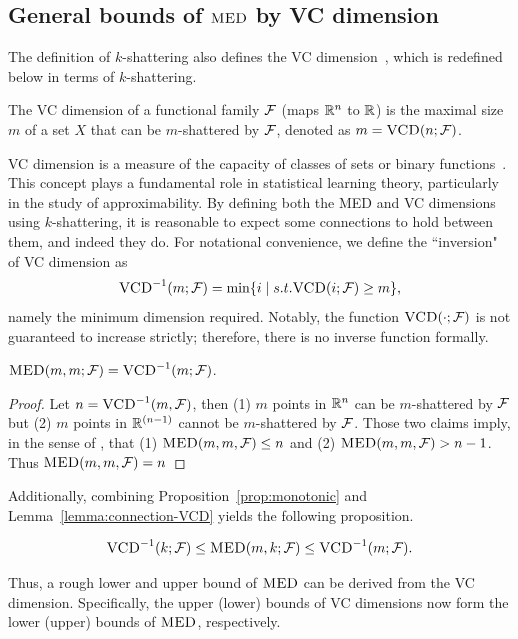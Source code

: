 \documentclass[10pt]{article}
\begin{document}
\subsection{General bounds of $\textsc{MED}$ by VC dimension}

The definition of $k$-shattering also defines the VC dimension~\cite{mohri2018foundations}, which is redefined below in terms of $k$-shattering.
\begin{definition}[VC dimension]
    The VC dimension of a functional family $\mathcal{F}$ (maps $\mathbb{R}^n$ to $\mathbb{R}$) is the maximal size $m$ of a set $X$ that can be $m$-shattered by $\mathcal{F}$, denoted as $m = \textsc{VCD}(n; \mathcal{F})$.
\end{definition}
VC dimension is a measure of the capacity of classes of sets or binary functions~\cite{vapnik2013nature}. This concept plays a fundamental role in statistical learning theory, particularly in the study of approximability. By defining both the MED and VC dimensions using $k$-shattering, it is reasonable to expect some connections to hold between them, and indeed they do. For notational convenience, we define the ``inversion" of VC dimension as $$\textsc{VCD}^{-1}(m; \mathcal{F})=\min \{i \mid s.t. \textsc{VCD}(i;\mathcal{F})\ge m\},$$ namely the minimum dimension required. Notably, the function $\textsc{VCD}(\cdot ;\mathcal{F})$ is not guaranteed to increase strictly; therefore, there is no inverse function formally.
\begin{lemma}\label{lemma:connection-VCD}
    $\textsc{MED}(m, m;\mathcal{F}) = \textsc{VCD}^{-1}(m;\mathcal{F})$.
\end{lemma}

\begin{proof}
    Let $n = \textsc{VCD}^{-1}(m, \mathcal{F})$, then (1) $m$ points in $\mathbb{R}^n$ can be $m$-shattered by $\mathcal{F}$ but (2) $m$ points in $\mathbb{R}^{(n-1)}$ cannot be $m$-shattered by $\mathcal{F}$. Those two claims imply, in the sense of \med, that (1) $\textsc{MED}(m, m, \mathcal{F}) \leq n$ and (2) $\textsc{MED}(m, m, \mathcal{F}) > n - 1$. Thus $\textsc{MED}(m, m, \mathcal{F}) = n$
\end{proof}


Additionally, combining Proposition~\ref{prop:monotonic} and Lemma~\ref{lemma:connection-VCD} yields the following proposition.
\begin{proposition}\label{prop:vc-bounds}
    $$\textsc{VCD}^{-1}(k; \mathcal{F}) \leq \textsc{MED}(m, k; \mathcal{F}) \leq \textsc{VCD}^{-1}(m; \mathcal{F}).$$
\end{proposition}
Thus, a rough lower and upper bound of $\textsc{MED}$ can be derived from the VC dimension. Specifically, the upper (lower) bounds of VC dimensions now form the lower (upper) bounds of $\textsc{MED}$, respectively.
\end{document}

